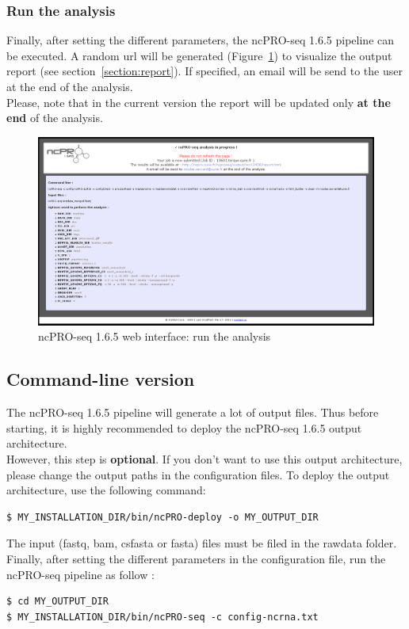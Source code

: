 \documentclass[12pt]{article}
\def \ncpip{ncPRO-seq 1.6.5}
\begin{document}
\subsubsection{Run the analysis}
Finally, after setting the different parameters, the \ncpip{} pipeline can be executed. A random url will be generated (Figure~\ref{fig:web8}) to visualize the output report (see section~\ref{section:report}). If specified, an email will be send to the user at the end of the analysis.\\
Please, note that in the current version the report will be updated only \textbf{at the end} of the analysis.
\begin{figure}[!h]
\includegraphics[width=\textwidth]{web_8.png}
\caption{\ncpip{} web interface: run the analysis}
\label{fig:web8}
\end{figure}
\newpage
\subsection{Command-line version}
\label{subsection:commandline}
The \ncpip{} pipeline will generate a lot of output files. Thus before starting, it is highly recommended to deploy the \ncpip{} output architecture.\\
However, this step is \textbf{optional}. If you don't want to use this output architecture, please change the output paths in the configuration files.
To deploy the output architecture, use the following command:
\begin{verbatim}
$ MY_INSTALLATION_DIR/bin/ncPRO-deploy -o MY_OUTPUT_DIR
\end{verbatim}

The input (fastq, bam, csfasta or fasta) files must be filed in the rawdata folder.
Finally, after setting the different parameters in the configuration file, run the ncPRO-seq pipeline as follow : 
\begin{verbatim}
$ cd MY_OUTPUT_DIR
$ MY_INSTALLATION_DIR/bin/ncPRO-seq -c config-ncrna.txt
\end{verbatim}
\end{document}
